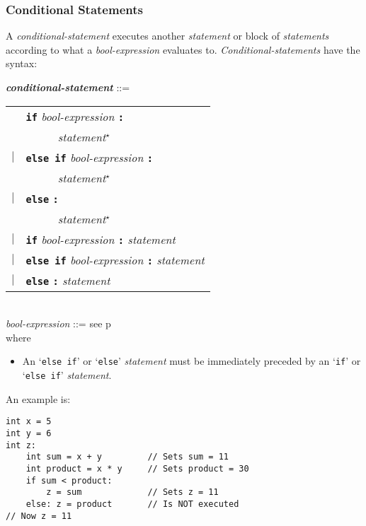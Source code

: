 \documentclass[12pt]{article}
\newcommand{\TT}[1]{{\tt \bfseries #1}}
\newcommand{\STAR}{{\Large $^\star$}}
\newcommand{\ttkey}[1]{{\tt \bfseries #1}}
\newcommand{\emkey}[1]{{\em \bfseries #1}}
\newcommand{\pagref}[1]{p\pageref{#1}}
\newenvironment{indpar}[1][0.3in]%
	{\begin{list}{}%
		     {\setlength{\itemsep}{0in}%
		      \setlength{\topsep}{0in}%
		      \setlength{\parsep}{1ex}%
		      \setlength{\labelwidth}{#1}%
		      \setlength{\leftmargin}{#1}%
		      \addtolength{\leftmargin}{\labelsep}}%
	 \item}%
	{\end{list}}
\begin{document}
\subsubsection{Conditional Statements}
\label{CONDITIONAL-STATEMENTS}

A {\em conditional-statement} executes another {\em statement}
or block of {\em statements} according to what a
{\em bool-expression} evaluates to.
{\em Conditional-statements} have the syntax:

\begin{indpar}
\emkey{conditional-statement} ::= \\
\hspace*{0.5in}\begin{tabular}[t]{rl}
        & \ttkey{if} {\em bool-expression} \TT{:} \\
	& ~~~~~ {\em statement}\STAR{} \\
    $|$ & \ttkey{else if} {\em bool-expression} \TT{:} \\
	& ~~~~~ {\em statement}\STAR{} \\
    $|$ & \ttkey{else} \TT{:} \\
	& ~~~~~ {\em statement}\STAR{} \\
    $|$ & \ttkey{if} {\em bool-expression} \TT{:} {\em statement} \\
    $|$ & \ttkey{else if} {\em bool-expression} \TT{:} {\em statement} \\
    $|$ & \ttkey{else} \TT{:} {\em statement} \\
	\end{tabular}
\\[0.5ex]
{\em bool-expression} ::= see \pagref{BOOL-EXPRESSION}
\\[1ex]
where
\begin{itemize}
\item An `{\tt else if}' or `{\tt else}' {\em statement} must be immediately
preceded by an `{\tt if}' or `{\tt else if}' {\em statement}.
\end{itemize}
\end{indpar}

An example is:
\begin{indpar}\begin{verbatim}
int x = 5
int y = 6
int z:
    int sum = x + y         // Sets sum = 11
    int product = x * y     // Sets product = 30
    if sum < product:
        z = sum             // Sets z = 11
    else: z = product       // Is NOT executed
// Now z = 11
\end{verbatim}\end{indpar}
\end{document}
